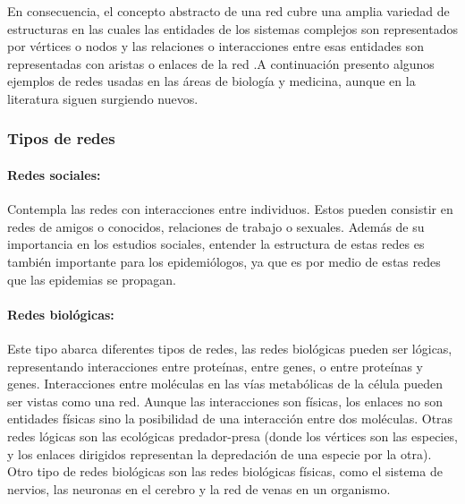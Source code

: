 En consecuencia, el concepto abstracto de una red cubre una amplia variedad de estructuras en las cuales las entidades de los sistemas complejos son representados por vértices o nodos y las relaciones o interacciones entre esas entidades son representadas con aristas o enlaces de la red \cite{Estrada2015ATheory}.A continuación presento algunos ejemplos de redes usadas en las áreas de biología y medicina, aunque en la literatura siguen surgiendo nuevos.

\subsubsection{Tipos de redes}
% 
% 
 
\paragraph{Redes sociales:} Contempla las redes con interacciones entre individuos. Estos pueden consistir en redes de amigos o conocidos, relaciones de trabajo o sexuales. Además de su importancia en los estudios sociales, entender la estructura de estas redes es también importante para los epidemiólogos, ya que es por medio de estas redes que las epidemias se propagan. \cite{Cohen2010}
 
\paragraph{Redes biológicas:}Este tipo abarca diferentes tipos de redes, las redes biológicas pueden ser lógicas, representando interacciones entre proteínas, entre genes, o entre proteínas y genes. Interacciones entre moléculas en las vías metabólicas de la célula pueden ser vistas como una red. Aunque las interacciones son físicas, los enlaces no son entidades físicas sino la posibilidad de una interacción entre dos moléculas. Otras redes lógicas son las ecológicas predador-presa (donde los vértices son las especies, y los enlaces dirigidos representan la depredación de una especie por la otra). Otro tipo de redes biológicas son las redes biológicas físicas, como el sistema de nervios, las neuronas en el cerebro y la red de venas en un organismo. \cite{Cohen2010}
 
